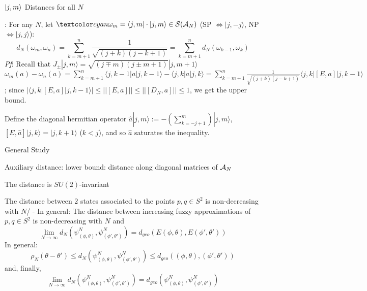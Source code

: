 \begin{frame}{$|j, m\rangle$ Distances for all $N$} %

: For any $N$, let $\lbtext{\omega_m} = \langle j, m| \cdot |j, m\rangle \in \mathcal S(\acal_N)$ (SP $\Longleftrightarrow |j, -j\rangle$, NP $\Longleftrightarrow |j, j\rangle$):
\begin{equation}
    d_N(\omega_m, \omega_n) = \sum_{k = m+1}^n \frac{1}{\sqrt{(j+k)(j-k+1)}} = \sum_{k = m+1}^n d_N(\omega_{k-1}, \omega_k)
\end{equation}
\textit{Pf}: Recall that $J_\pm|j,m\rangle = \sqrt{(j\mp m)(j\pm m + 1)}|j, m+1 \rangle$ \then $\omega_m(a) - \omega_n(a) = \sum_{k = m+1}^n \langle j, k-1 |a|j, k-1 \rangle - \langle j, k |a| j, k \rangle = \sum_{k = m+1}^n \frac{1}{\sqrt{(j+k)(j-k+1)}} \langle j, k| [E, a] |j, k-1 \rangle$; since $|\langle j, k |[E, a]|j, k-1 \rangle|  \leq ||[E, a]|| \leq ||[D_N, a]|| \leq 1$, we get the upper bound. 

Define the diagonal hermitian operator $\hat a |j, m\rangle := - \left( \sum_{k = -j+1}^m  \right)|j, m\rangle$, \then $[E, \hat a] |j, k \rangle = |j, k+1\rangle$ ($k < j$), and so $\hat a$ saturates the inequality.
\end{frame}

\begin{frame}{General Study} %

Auxiliary distance: lower bound: distance along diagonal matrices of $\mathcal A_N$

The distance is $SU(2)$-invariant

The distance between $2$ states associated to the points $p, q \in S^2$ is non-decreasing with $N$/
- In general:
    The distance between increasing fuzzy approximations of $p, q \in S^2$ is non-decreasing with $N$ and
    \begin{equation}
        \lim_{N \to \infty} d_N(\psi^N_{(\phi, \theta)}, \psi^N_{(\phi', \theta')}) = d_{geo}(E(\phi, \theta), E(\phi', \theta'))
    \end{equation}
In general:
    \begin{equation}
        \rho_N(\theta - \theta') \leq d_N(\psi^N_{(\phi, \theta)}, \psi^N_{(\phi', \theta')}) \leq d_{geo}((\phi, \theta), (\phi', \theta'))
    \end{equation} and, finally,
    \begin{equation}
        \lim_{N \to \infty} d_N(\psi^N_{(\phi, \theta)}, \psi^N_{(\phi', \theta')}) = d_{geo}(\psi^N_{(\phi, \theta)}, \psi^N_{(\phi', \theta')})
    \end{equation}
\end{frame}


